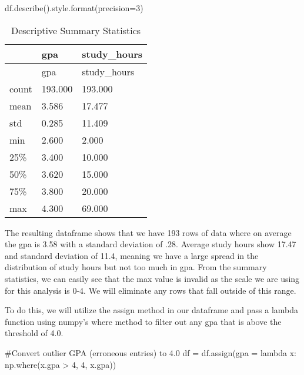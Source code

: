 \documentclass[
  letterpaper,
  DIV=11,
  numbers=noendperiod]{scrreprt}
\newenvironment{Shaded}{\begin{snugshade}}{\end{snugshade}}
\newcommand{\BuiltInTok}[1]{\textcolor[rgb]{0.00,0.23,0.31}{#1}}
\newcommand{\CommentTok}[1]{\textcolor[rgb]{0.37,0.37,0.37}{#1}}
\newcommand{\DecValTok}[1]{\textcolor[rgb]{0.68,0.00,0.00}{#1}}
\newcommand{\KeywordTok}[1]{\textcolor[rgb]{0.00,0.23,0.31}{#1}}
\newcommand{\NormalTok}[1]{\textcolor[rgb]{0.00,0.23,0.31}{#1}}
\newcommand{\OperatorTok}[1]{\textcolor[rgb]{0.37,0.37,0.37}{#1}}
\begin{document}
\begin{Shaded}
\begin{Highlighting}[]
\NormalTok{df.describe().style.}\BuiltInTok{format}\NormalTok{(precision}\OperatorTok{=}\DecValTok{3}\NormalTok{)}
\end{Highlighting}
\end{Shaded}

\hypertarget{tbl-describe}{}
\begin{longtable}[]{@{}lll@{}}
\caption{\label{tbl-describe}Descriptive Summary
Statistics}\label{T_2a29d}\tabularnewline
\toprule\noalign{}
~ & gpa & study\_hours \\
\midrule\noalign{}
\endfirsthead
\toprule\noalign{}
~ & gpa & study\_hours \\
\midrule\noalign{}
\endhead
\bottomrule\noalign{}
\endlastfoot
count & 193.000 & 193.000 \\
mean & 3.586 & 17.477 \\
std & 0.285 & 11.409 \\
min & 2.600 & 2.000 \\
25\% & 3.400 & 10.000 \\
50\% & 3.620 & 15.000 \\
75\% & 3.800 & 20.000 \\
max & 4.300 & 69.000 \\
\end{longtable}

The resulting dataframe shows that we have 193 rows of data where on
average the gpa is 3.58 with a standard deviation of .28. Average study
hours show 17.47 and standard deviation of 11.4, meaning we have a large
spread in the distribution of study hours but not too much in gpa. From
the summary statistics, we can easily see that the max value is invalid
as the scale we are using for this analysis is 0-4. We will eliminate
any rows that fall outside of this range.

To do this, we will utilize the assign method in our dataframe and pass
a lambda function using numpy's where method to filter out any gpa that
is above the threshold of 4.0.

\begin{Shaded}
\begin{Highlighting}[]
\CommentTok{\#Convert outlier GPA (erroneous entries) to 4.0}
\NormalTok{df }\OperatorTok{=}\NormalTok{ df.assign(gpa }\OperatorTok{=} \KeywordTok{lambda}\NormalTok{ x: np.where(x.gpa }\OperatorTok{\textgreater{}} \DecValTok{4}\NormalTok{, }\DecValTok{4}\NormalTok{, x.gpa))}
\end{Highlighting}
\end{Shaded}
\end{document}
